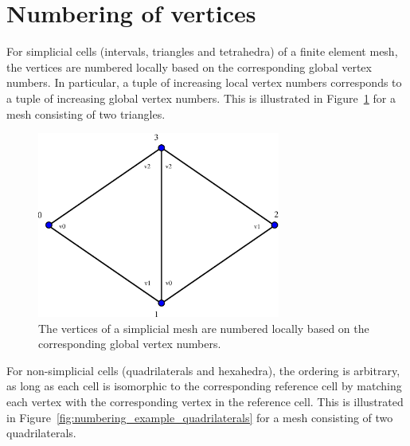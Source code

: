 \section{Numbering of vertices}

For simplicial cells (intervals, triangles and tetrahedra) of a finite
element mesh, the vertices are numbered locally based on the
corresponding global vertex numbers. In particular, a tuple of
increasing local vertex numbers corresponds to a tuple of increasing
global vertex numbers.  This is illustrated in
Figure~\ref{fig:numbering_example_triangles} for a mesh consisting of
two triangles.
 
\begin{figure}[htbp]
  \begin{center}
    \includegraphics[width=8cm]{eps/numbering_example_triangles.eps}
    \caption{The vertices of a simplicial mesh are numbered locally
      based on the corresponding global vertex numbers.}
    \label{fig:numbering_example_triangles}
  \end{center}
\end{figure}

For non-simplicial cells (quadrilaterals and hexahedra), the ordering
is arbitrary, as long as each cell is isomorphic to the corresponding
reference cell by matching each vertex with the corresponding vertex
in the reference cell. This is illustrated in
Figure~\ref{fig:numbering_example_quadrilaterals} for a mesh
consisting of two quadrilaterals.

